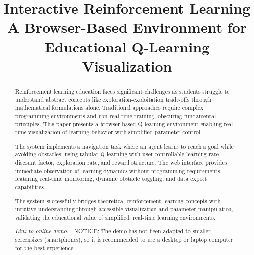 \documentclass[conference]{IEEEtran}
\begin{document}
\title{Interactive Reinforcement Learning\\
{\footnotesize A Browser-Based Environment for Educational Q-Learning Visualization}
}

\author{
}

\maketitle

\begin{abstract}
Reinforcement learning education faces significant challenges as students struggle to understand abstract concepts like exploration-exploitation trade-offs through mathematical formulations alone. Traditional approaches require complex programming environments and non-real-time training, obscuring fundamental principles. This paper presents a browser-based Q-learning environment enabling real-time visualization of learning behavior with simplified parameter control.

The system implements a navigation task where an agent learns to reach a goal while avoiding obstacles, using tabular Q-learning with user-controllable learning rate, discount factor, exploration rate, and reward structure. The web interface provides immediate observation of learning dynamics without programming requirements, featuring real-time monitoring, dynamic obstacle toggling, and data export capabilities.

The system successfully bridges theoretical reinforcement learning concepts with intuitive understanding through accessible visualization and parameter manipulation, validating the educational value of simplified, real-time learning environments.

\href{https://jakobjgarde.github.io/reinforced/}{\color{blue}\textit{Link to online demo}}. - NOTICE: The demo has not been adapted to smaller screensizes (smartphones), so it is recommended to use a desktop or laptop computer for the best experience.
\end{abstract}









\end{document}
